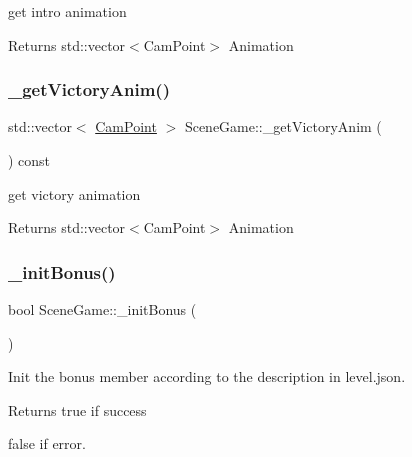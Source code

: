 get intro animation 

\begin{DoxyReturn}{Returns}
std\+::vector$<$\+Cam\+Point$>$ Animation 
\end{DoxyReturn}
\mbox{\label{class_scene_game_a39f1c1fd2d9948017b3c7603d2d72d1f}} 
\subsubsection{\texorpdfstring{\+\_\+get\+Victory\+Anim()}{\_getVictoryAnim()}}
{\footnotesize\ttfamily std\+::vector$<$ \hyperlink{struct_cam_point}{Cam\+Point} $>$ Scene\+Game\+::\+\_\+get\+Victory\+Anim (\begin{DoxyParamCaption}{ }\end{DoxyParamCaption}) const\hspace{0.3cm}{\ttfamily [protected]}}



get victory animation 

\begin{DoxyReturn}{Returns}
std\+::vector$<$\+Cam\+Point$>$ Animation 
\end{DoxyReturn}
\mbox{\label{class_scene_game_a03235b8b2b34ee0059ebba1e7c0a8ac6}} 
\subsubsection{\texorpdfstring{\+\_\+init\+Bonus()}{\_initBonus()}}
{\footnotesize\ttfamily bool Scene\+Game\+::\+\_\+init\+Bonus (\begin{DoxyParamCaption}{ }\end{DoxyParamCaption})\hspace{0.3cm}{\ttfamily [protected]}}



Init the bonus member according to the description in level.\+json. 

\begin{DoxyReturn}{Returns}
true if success 

false if error. 
\end{DoxyReturn}
\mbox{\label{class_scene_game_a50787dc8e9c4fd8df0c5bd918e48f3f5}} 
